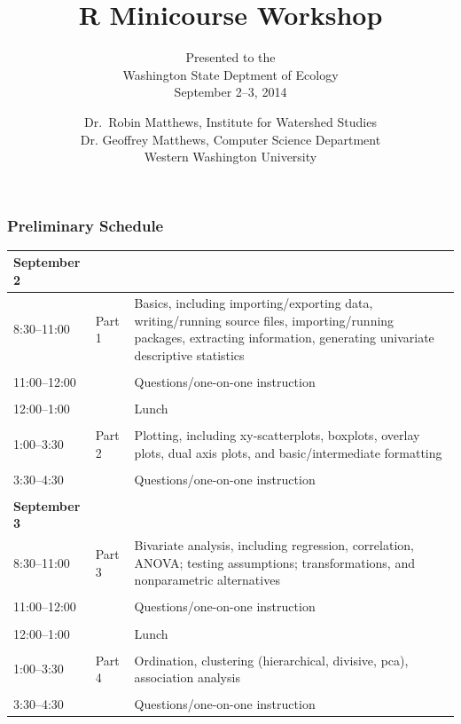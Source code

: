 \documentclass[10pt]{beamer}
\title{R Minicourse Workshop}
\author{\small Presented to the\\
        Washington State Deptment of Ecology\\
       September 2--3, 2014}
\date{\scriptsize Dr.~Robin Matthews, Institute for Watershed Studies\\
   Dr. Geoffrey Matthews, Computer Science Department\\
   Western Washington University}
\begin{document}
\newcommand{\be}{\begin{enumerate}}
\newcommand{\ee}{\end{enumerate}}
\newcommand{\bi}{\begin{itemize}}
\newcommand{\ei}{\end{itemize}}
\newcommand{\bd}{\begin{description}}
\newcommand{\ed}{\end{description}}


\begin{frame}
\titlepage
\end{frame}

\begin{frame}
\frametitle{Preliminary Schedule}

{\scriptsize
\begin{tabular}{llp{3in}}
{\bf September 2} & & \\\hline
8:30--11:00 & Part 1 & Basics, including importing/exporting data,
writing/running source files, importing/running packages, extracting
information, generating univariate descriptive statistics\\
  & & \\
11:00--12:00 & & Questions/one-on-one instruction\\
  & & \\
12:00--1:00  & & Lunch \\
  & & \\
1:00--3:30 & Part 2 & Plotting, including xy-scatterplots,
boxplots, overlay plots, dual axis plots, and basic/intermediate
formatting\\
  & & \\
3:30--4:30 & & Questions/one-on-one instruction\\
  & \\
{\bf September 3} & &\\\hline
8:30--11:00 & Part 3 & Bivariate analysis, including regression,
correlation, ANOVA; testing assumptions;
transformations, and nonparametric alternatives\\
  & \\
11:00--12:00 & & Questions/one-on-one instruction\\
  & \\
12:00--1:00 & & Lunch \\
  & \\
1:00--3:30 & Part 4 & Ordination, clustering (hierarchical, divisive, pca), association analysis\\
  & \\
3:30--4:30 & & Questions/one-on-one instruction\\
\end{tabular}
}
\end{frame}
\end{document}
